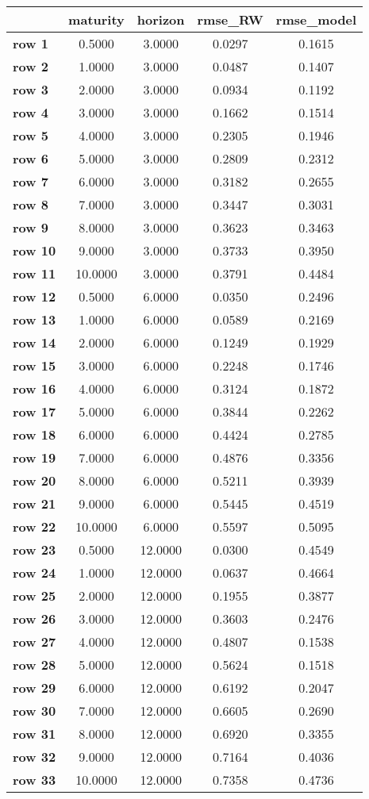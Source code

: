 \begin{tiny}\begin{tabular}{|l|c|c|c|c|}
\hline
&\textbf{maturity}&\textbf{horizon}&\textbf{rmse_RW}&\textbf{rmse_model}\\\hline
\textbf{row 1}&0.5000&3.0000&0.0297&0.1615\\\hline
\textbf{row 2}&1.0000&3.0000&0.0487&0.1407\\\hline
\textbf{row 3}&2.0000&3.0000&0.0934&0.1192\\\hline
\textbf{row 4}&3.0000&3.0000&0.1662&0.1514\\\hline
\textbf{row 5}&4.0000&3.0000&0.2305&0.1946\\\hline
\textbf{row 6}&5.0000&3.0000&0.2809&0.2312\\\hline
\textbf{row 7}&6.0000&3.0000&0.3182&0.2655\\\hline
\textbf{row 8}&7.0000&3.0000&0.3447&0.3031\\\hline
\textbf{row 9}&8.0000&3.0000&0.3623&0.3463\\\hline
\textbf{row 10}&9.0000&3.0000&0.3733&0.3950\\\hline
\textbf{row 11}&10.0000&3.0000&0.3791&0.4484\\\hline
\textbf{row 12}&0.5000&6.0000&0.0350&0.2496\\\hline
\textbf{row 13}&1.0000&6.0000&0.0589&0.2169\\\hline
\textbf{row 14}&2.0000&6.0000&0.1249&0.1929\\\hline
\textbf{row 15}&3.0000&6.0000&0.2248&0.1746\\\hline
\textbf{row 16}&4.0000&6.0000&0.3124&0.1872\\\hline
\textbf{row 17}&5.0000&6.0000&0.3844&0.2262\\\hline
\textbf{row 18}&6.0000&6.0000&0.4424&0.2785\\\hline
\textbf{row 19}&7.0000&6.0000&0.4876&0.3356\\\hline
\textbf{row 20}&8.0000&6.0000&0.5211&0.3939\\\hline
\textbf{row 21}&9.0000&6.0000&0.5445&0.4519\\\hline
\textbf{row 22}&10.0000&6.0000&0.5597&0.5095\\\hline
\textbf{row 23}&0.5000&12.0000&0.0300&0.4549\\\hline
\textbf{row 24}&1.0000&12.0000&0.0637&0.4664\\\hline
\textbf{row 25}&2.0000&12.0000&0.1955&0.3877\\\hline
\textbf{row 26}&3.0000&12.0000&0.3603&0.2476\\\hline
\textbf{row 27}&4.0000&12.0000&0.4807&0.1538\\\hline
\textbf{row 28}&5.0000&12.0000&0.5624&0.1518\\\hline
\textbf{row 29}&6.0000&12.0000&0.6192&0.2047\\\hline
\textbf{row 30}&7.0000&12.0000&0.6605&0.2690\\\hline
\textbf{row 31}&8.0000&12.0000&0.6920&0.3355\\\hline
\textbf{row 32}&9.0000&12.0000&0.7164&0.4036\\\hline
\textbf{row 33}&10.0000&12.0000&0.7358&0.4736\\\hline
\end{tabular}
\end{tiny}